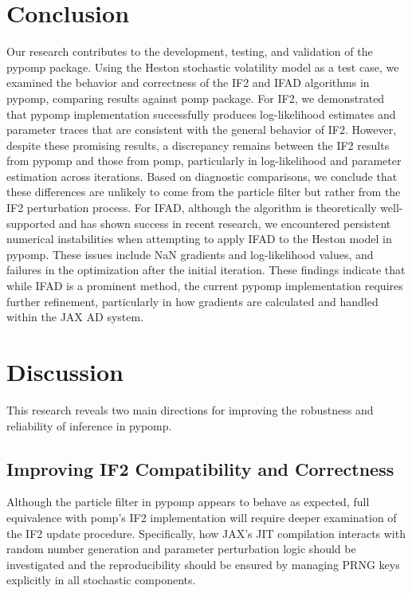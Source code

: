 \documentclass[11pt]{report}
\begin{document}
\chapter{Conclusion}\label{chap:conclusion}
Our research contributes to the development, testing, and validation of the pypomp package. Using the Heston stochastic volatility model as a test case, we examined the behavior and correctness of the IF2 and IFAD algorithms in pypomp, comparing results against pomp package.
For IF2, we demonstrated that pypomp implementation successfully produces log-likelihood estimates and parameter traces that are consistent with the general behavior of IF2. However, despite these promising results, a discrepancy remains between the IF2 results from pypomp and those from pomp, particularly in log-likelihood and parameter estimation across iterations. Based on diagnostic comparisons, we conclude that these differences are unlikely to come from the particle filter but rather from the IF2 perturbation process.
For IFAD, although the algorithm is theoretically well-supported and has shown success in recent research, we encountered persistent numerical instabilities when attempting to apply IFAD to the Heston model in pypomp. These issues include NaN gradients and log-likelihood values, and failures in the optimization after the initial iteration. These findings indicate that while IFAD is a prominent method, the current pypomp implementation requires further refinement, particularly in how gradients are calculated and handled within the JAX AD system.


\chapter{Discussion}\label{chap:discussion}
This research reveals two main directions for improving the robustness and reliability of inference in pypomp.
\section{Improving IF2 Compatibility and Correctness}
Although the particle filter in pypomp appears to behave as expected, full equivalence with pomp's IF2 implementation will require deeper examination of the IF2 update procedure. Specifically, how JAX’s JIT compilation interacts with random number generation and parameter perturbation logic should be investigated and the reproducibility should be ensured by managing PRNG keys explicitly in all stochastic components. 
\end{document}
